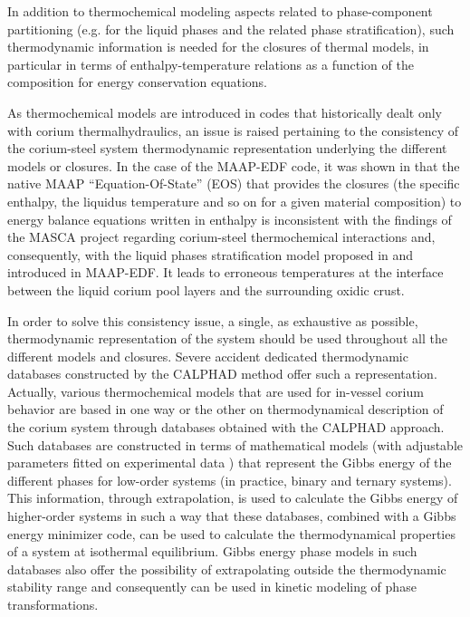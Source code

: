 \documentclass[11pt]{article}\usepackage{geometry} \geometry{letterpaper, margin=25.4mm}
\begin{document}
In addition to thermochemical modeling aspects related to phase-component partitioning (e.g. for the liquid phases and the related phase stratification), such thermodynamic information is needed for the closures of thermal models, in particular in terms of enthalpy-temperature relations as a function of the composition for energy conservation equations.

As thermochemical models are introduced in codes that historically dealt only with corium thermalhydraulics, an issue is raised pertaining to the consistency of the corium-steel system thermodynamic representation underlying the different models or closures. In the case of the MAAP-EDF code, it was shown in \cite{Bakouta2015} that the native MAAP ``Equation-Of-State'' (EOS) that provides the closures (the specific enthalpy, the liquidus temperature and so on for a given material composition) to energy balance equations written in enthalpy is inconsistent with the findings of the MASCA project regarding corium-steel thermochemical interactions and, consequently, with the liquid phases stratification model proposed in \cite{LeTellier2014} and introduced in MAAP-EDF. It leads to erroneous temperatures at the interface between the liquid corium pool layers and the surrounding oxidic crust. 

In order to solve this consistency issue, a single, as exhaustive as possible, thermodynamic representation of the system should be used throughout all the different models and closures. Severe accident dedicated thermodynamic databases constructed by the CALPHAD method \cite{Lukas2007} offer such a representation. Actually, various thermochemical models that are used for in-vessel corium behavior are based in one way or the other on thermodynamical description of the corium system through databases obtained with the CALPHAD approach. Such databases are constructed in terms of mathematical models (with adjustable parameters fitted on experimental data \cite{Barrachin2004, Gueneau2015}) that represent the Gibbs energy of the different phases for low-order systems (in practice, binary and ternary systems). This information, through extrapolation, is used to calculate the Gibbs energy of higher-order systems in such a way that these databases, combined with a Gibbs energy minimizer code, can be used to calculate the thermodynamical properties of a system at isothermal equilibrium. Gibbs energy phase models in such databases also offer the possibility of extrapolating outside the thermodynamic stability range and consequently can be used in kinetic modeling of phase transformations.
\end{document}

